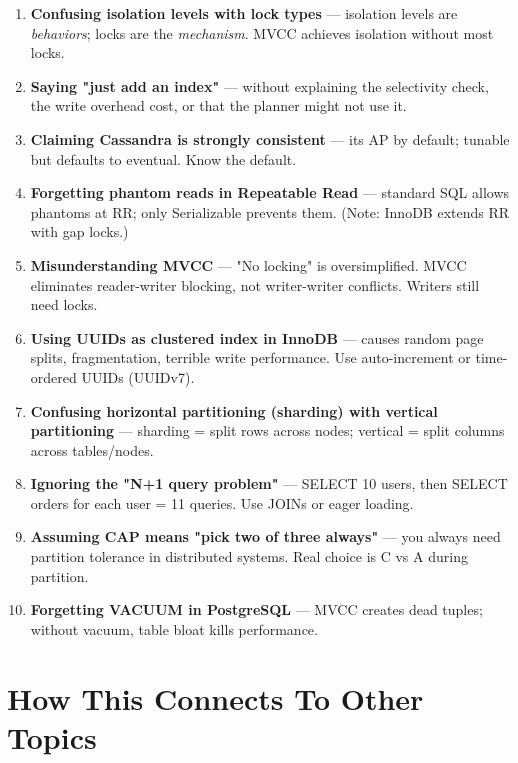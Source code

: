 \documentclass[11pt]{article}
\begin{document}
\begin{enumerate}
\def\labelenumi{\arabic{enumi}.}
\item
  \textbf{Confusing isolation levels with lock types} --- isolation levels are \emph{behaviors}; locks are the \emph{mechanism}. MVCC achieves isolation without most locks.
\item
  \textbf{Saying "just add an index"} --- without explaining the selectivity check, the write overhead cost, or that the planner might not use it.
\item
  \textbf{Claiming Cassandra is strongly consistent} --- it\textquotesingle s AP by default; tunable but defaults to eventual. Know the default.
\item
  \textbf{Forgetting phantom reads in Repeatable Read} --- standard SQL allows phantoms at RR; only Serializable prevents them. (Note: InnoDB extends RR with gap locks.)
\item
  \textbf{Misunderstanding MVCC} --- "No locking" is oversimplified. MVCC eliminates reader-writer blocking, not writer-writer conflicts. Writers still need locks.
\item
  \textbf{Using UUIDs as clustered index in InnoDB} --- causes random page splits, fragmentation, terrible write performance. Use auto-increment or time-ordered UUIDs (UUIDv7).
\item
  \textbf{Confusing horizontal partitioning (sharding) with vertical partitioning} --- sharding = split rows across nodes; vertical = split columns across tables/nodes.
\item
  \textbf{Ignoring the "N+1 query problem"} --- SELECT 10 users, then SELECT orders for each user = 11 queries. Use JOINs or eager loading.
\item
  \textbf{Assuming CAP means "pick two of three always"} --- you always need partition tolerance in distributed systems. Real choice is C vs A during partition.
\item
  \textbf{Forgetting VACUUM in PostgreSQL} --- MVCC creates dead tuples; without vacuum, table bloat kills performance.
\end{enumerate}

\section{How This Connects To Other Topics}\label{how-this-connects-to-other-topics}
\end{document}
